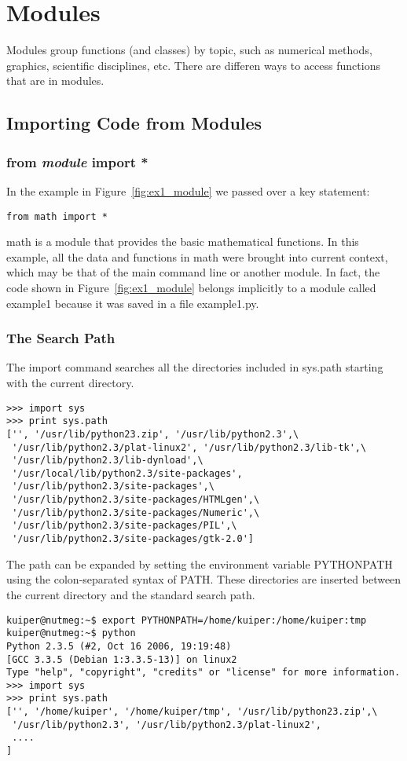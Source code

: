 \documentclass{article}
\begin{document}
\section{Modules}

Modules group functions (and classes) by topic, such as numerical methods,
graphics, scientific disciplines, etc.  There are differen ways to access
functions that are in modules.

\subsection{Importing Code from Modules}

\subsubsection{{\ttfamily from {\itshape module} import *}}

In the example in Figure~\ref{fig:ex1_module} we passed over a key statement:
\begin{verbatim}
from math import *
\end{verbatim}
{\ttfamily math} is a module that provides the basic mathematical functions.
In this example, all the data and functions in {\ttfamily math} were brought into
current context, which may be that of the main command line or another module.
In fact, the code shown in Figure~\ref{fig:ex1_module} belongs implicitly to a
module called {\ttfamily example1} because it was saved in a file 
{\ttfamily example1.py}.

\subsubsection{The Search Path}

The {\ttfamily import} command searches all the directories
included in {\ttfamily sys.path} starting with the current directory.
\begin{verbatim}
>>> import sys
>>> print sys.path
['', '/usr/lib/python23.zip', '/usr/lib/python2.3',\
 '/usr/lib/python2.3/plat-linux2', '/usr/lib/python2.3/lib-tk',\
 '/usr/lib/python2.3/lib-dynload',\
 '/usr/local/lib/python2.3/site-packages',
 '/usr/lib/python2.3/site-packages',\
 '/usr/lib/python2.3/site-packages/HTMLgen',\
 '/usr/lib/python2.3/site-packages/Numeric',\
 '/usr/lib/python2.3/site-packages/PIL',\
 '/usr/lib/python2.3/site-packages/gtk-2.0']
\end{verbatim}
The path can be expanded by setting the environment variable {\ttfamily PYTHONPATH}
using the colon-separated syntax of {\ttfamily PATH}. These directories are
inserted between the current directory and the standard search path.
{\small \begin{verbatim}
kuiper@nutmeg:~$ export PYTHONPATH=/home/kuiper:/home/kuiper:tmp
kuiper@nutmeg:~$ python
Python 2.3.5 (#2, Oct 16 2006, 19:19:48)
[GCC 3.3.5 (Debian 1:3.3.5-13)] on linux2
Type "help", "copyright", "credits" or "license" for more information.
>>> import sys
>>> print sys.path
['', '/home/kuiper', '/home/kuiper/tmp', '/usr/lib/python23.zip',\
 '/usr/lib/python2.3', '/usr/lib/python2.3/plat-linux2',
 ....
]
\end{verbatim}}
\end{document}
